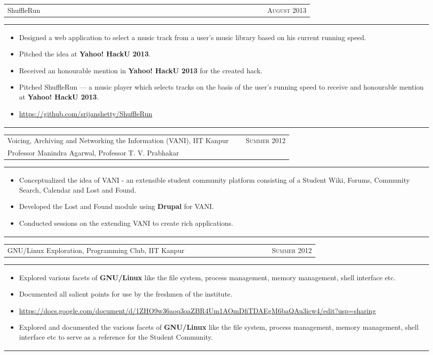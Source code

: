 \documentclass[a4paper,10pt]{article} %
\newcommand{\lproject}[4]{
    \begin{tabular}{p{0.80\linewidth}r}
        \textcolor{NavyBlue}{#2} & \multicolumn{1}{m{4cm}}{\raggedleft \textsc{#1}}\\
        #3
    \end{tabular}
    \begin{tabular}{p{\linewidth}}
    \vspace{-0.3cm}
        \footnotesize{#4}
    \end{tabular}
    \vspace{-0.5cm}
}
\newcommand{\iproject}[3]{
    \begin{tabular}{p{0.85\linewidth}r}
        \textcolor{NavyBlue}{#2} & \multicolumn{1}{m{3cm}}{\raggedleft \textsc{#1}}\\
    \end{tabular}
    \begin{tabular}{p{\linewidth}}
    \vspace{-0.3cm}
        \footnotesize{#3}
    \end{tabular}
    \vspace{-0.5cm}
}
\begin{document}
\iproject {August 2013}
          {ShuffleRun}
          {
              \begin{itemize}[leftmargin=0.5cm]
                  \item Designed a web application to select a music track from a user's music library based on his current running speed.
                  \item Pitched the idea at \textbf{Yahoo! HackU 2013}.
                  \item Received an honourable mention in \textbf{Yahoo!  HackU 2013} for the created hack.
                  \item Pitched ShuffleRun --- a music player which selects tracks on the basis of the user's running speed to receive
                      and honourable mention at \textbf{Yahoo! HackU 2013}.
                  \item \href{https://github.com/srijanshetty/ShuffleRun} {https://github.com/srijanshetty/ShuffleRun}
              \end{itemize}
          }

\lproject {Summer 2012}
          {Voicing, Archiving and Networking the Information \textsc{(VANI)}, IIT Kanpur}
          {Professor Manindra Agarwal, Professor T. V. Prabhakar}
          {
              \begin{itemize}[leftmargin=0.5cm]
                  \item Conceptualized the idea of VANI - an extensible student community platform consisting
                      of a Student Wiki, Forums, Community Search, Calendar and Lost and Found.
                  \item Developed the Lost and Found module using \textbf{Drupal} for VANI.
                  \item Conducted sessions on the extending VANI to create rich applications.
              \end{itemize}
          }

\iproject {Summer 2012}
          {GNU/Linux Exploration, Programming Club, IIT Kanpur}
          {
              \begin{itemize}[leftmargin=0.5cm]
                  \item Explored various facets of \textbf{GNU/Linux} like the file system, process management, memory management,
                      shell interface etc.
                  \item Documented all salient points for use by the freshmen of the institute.
                  \item \href{https://docs.google.com/document/d/1ZHO9w36aoq3oaZBR4Um1AOmDfiTDAEgM6baQAu3icw4/edit?usp=sharing}{https://docs.google.com/document/d/1ZHO9w36aoq3oaZBR4Um1AOmDfiTDAEgM6baQAu3icw4/edit?usp=sharing}
                  \item Explored and documented the various facets of \textbf{GNU/Linux} like the file system, process management, memory management,
                      shell interface etc to serve as a reference for the Student Community.
              \end{itemize}
          }
\end{document}
